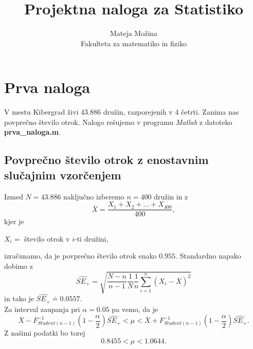\documentclass[a4paper,12pt]{article}
\author{Mateja Možina \\ Fakulteta za matematiko in fiziko}
\title{
\huge  {Projektna naloga za Statistiko} }
\begin{document}


\maketitle


\newpage

\section{Prva naloga}
V mestu Kibergrad živi 43.886 družin, razporejenih v 4 četrti. Zanima nas povprečno število otrok. Nalogo rešujemo v 
programu \emph{Matlab} z datoteko \textbf{prva\_naloga.m}.
%
%
\subsection{Povprečno število otrok z enostavnim slučajnim vzorčenjem}
Izmed $N = 43.886$ naključno izberemo $n = 400$ družin in z
\begin{equation*}
    \overline{X} = \frac{X_1+X_2 + \dots + X_{400}}{400},
\end{equation*}
kjer je 
\begin{center}
    $X_i=$ število otrok v $i$-ti družini,
\end{center}
izračunamo, da je povprečno število otrok enako $0.955$. Standardno napako dobimo z
\begin{equation*}
    \widehat{SE_{+}} = \sqrt{\frac{N-n}{n-1}\frac{1}{N}\frac{1}{n}\sum_{i=1}^{n}(X_i - \overline{X})^2}
\end{equation*}
in tako je $\widehat{SE_{+}} \doteq 0.0557$.\\
Za interval zaupanja pri $\alpha=0.05$ pa vemo, da je
\begin{equation*}
    \overline{X} - F^{-1}_{Student(n-1)}\left(1-\frac{\alpha}{2}\right)\widehat{SE_{+}} < \mu < \overline{X} + F^{-1}_{Student(n-1)}\left(1-\frac{\alpha}{2}\right)\widehat{SE_{+}}.
\end{equation*}
Z našimi podatki bo torej
\begin{equation*}
    0.8455 < \mu < 1.0644.
\end{equation*}
%
%
\end{document}

